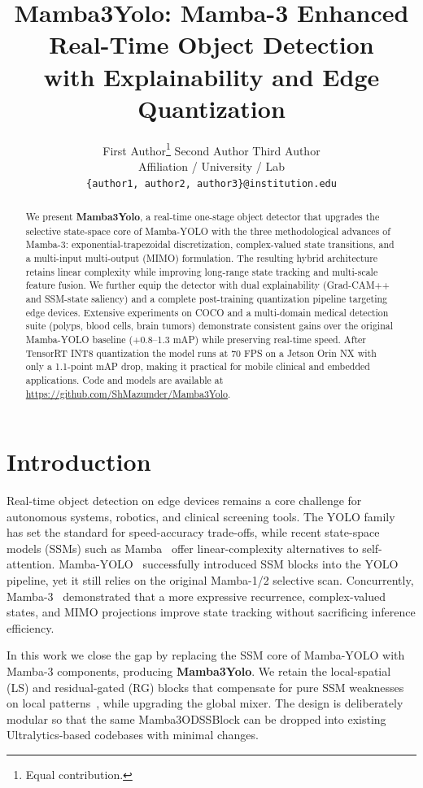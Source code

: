 \documentclass[10pt,twocolumn,letterpaper]{article}
\title{Mamba3Yolo: Mamba-3 Enhanced Real-Time Object Detection\\
with Explainability and Edge Quantization}
\author{
  First Author\thanks{Equal contribution.} \quad
  Second Author \quad
  Third Author \\
  \small Affiliation / University / Lab \\
  \small \texttt{\{author1, author2, author3\}@institution.edu}
}
\begin{document}
\maketitle

\begin{abstract}
We present \textbf{Mamba3Yolo}, a real-time one-stage object detector that upgrades the selective state-space core of Mamba-YOLO with the three methodological advances of Mamba-3: exponential-trapezoidal discretization, complex-valued state transitions, and a multi-input multi-output (MIMO) formulation. The resulting hybrid architecture retains linear complexity while improving long-range state tracking and multi-scale feature fusion. We further equip the detector with dual explainability (Grad-CAM++ and SSM-state saliency) and a complete post-training quantization pipeline targeting edge devices. Extensive experiments on COCO and a multi-domain medical detection suite (polyps, blood cells, brain tumors) demonstrate consistent gains over the original Mamba-YOLO baseline (+0.8--1.3 mAP) while preserving real-time speed. After TensorRT INT8 quantization the model runs at 70 FPS on a Jetson Orin NX with only a 1.1-point mAP drop, making it practical for mobile clinical and embedded applications. Code and models are available at \url{https://github.com/ShMazumder/Mamba3Yolo}.
\end{abstract}

\section{Introduction}
\label{sec:intro}

Real-time object detection on edge devices remains a core challenge for autonomous systems, robotics, and clinical screening tools. The YOLO family~\cite{redmon2016yolo,jocher2023yolov8} has set the standard for speed-accuracy trade-offs, while recent state-space models (SSMs) such as Mamba~\cite{gu2023mamba} offer linear-complexity alternatives to self-attention. Mamba-YOLO~\cite{wang2025mambayolo} successfully introduced SSM blocks into the YOLO pipeline, yet it still relies on the original Mamba-1/2 selective scan. Concurrently, Mamba-3~\cite{lahoti2026mamba3} demonstrated that a more expressive recurrence, complex-valued states, and MIMO projections improve state tracking without sacrificing inference efficiency.

In this work we close the gap by replacing the SSM core of Mamba-YOLO with Mamba-3 components, producing \textbf{Mamba3Yolo}. We retain the local-spatial (LS) and residual-gated (RG) blocks that compensate for pure SSM weaknesses on local patterns~\cite{yu2025mambaout}, while upgrading the global mixer. The design is deliberately modular so that the same Mamba3ODSSBlock can be dropped into existing Ultralytics-based codebases with minimal changes.
\end{document}
